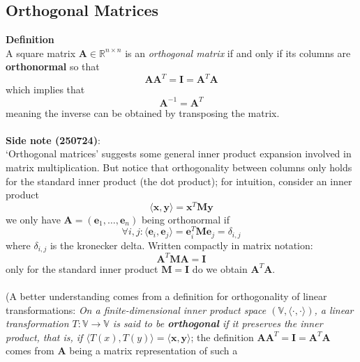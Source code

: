 \documentclass{report}
\begin{document}
\subsection{Orthogonal Matrices} %
\label{analytic geometry:orthogonal matrices}
\textbf{Definition}\\
A square matrix $\bm{A}\in\mathbb{R}^{n\times n}$ is an \textit{orthogonal matrix} if and only if its columns are
\textbf{orthonormal} so that 
\begin{equation*}
\bm{AA}^T=\bm{I}=\bm{A}^T\bm{A}
\end{equation*}
which implies that
\begin{equation*}
\bm{A}^{-1}=\bm{A}^T
\end{equation*}
meaning the inverse can be obtained by transposing the matrix.\\
\vspace{1mm}\\
\textbf{Side note (250724)}:\\
`Orthogonal matrices' suggests some general
inner product expansion involved in matrix multiplication. But notice that orthogonality between columns
only holds for the standard inner product (the dot product); for intuition, consider an inner product
\begin{equation*}
\langle\bm{x},\bm{y}\rangle=\bm{x}^T\bm{M}\bm{y}
\end{equation*}
we only have $\bm{A}=(\bm{e}_1,\ldots,\bm{e}_n)$ being orthonormal if 
\begin{equation*}
\forall i,j:
\langle\bm{e}_i,\bm{e}_j\rangle=\bm{e}_i^T\bm{M}\bm{e}_j
=\delta_{i,j}
\end{equation*}
where $\delta_{i,j}$ is the kronecker delta. Written compactly in matrix notation:
\begin{equation*}
\bm{A}^T\bm{MA}=\bm{I}
\end{equation*}
only for the standard inner product $\bm{M}=\bm{I}$ do we
obtain $\bm{A}^T\bm{A}$.\\
\vspace{1mm}\\
(A better understanding comes from a definition for orthogonality of linear transformations: 
\textit{On a finite-dimensional inner product space $(\mathbb{V},\langle\cdot,\cdot\rangle)$, 
a linear transformation $T:\mathbb{V}\to\mathbb{V}$ is said to be \textbf{orthogonal} if it preserves 
the inner product, that is, if $\langle T(x),T(y)\rangle=\langle\bm{x},\bm{y}\rangle$};
the definition $\bm{AA}^T=\bm{I}=\bm{A}^T\bm{A}$ comes from $\bm{A}$ being a matrix representation of such a
\end{document}

